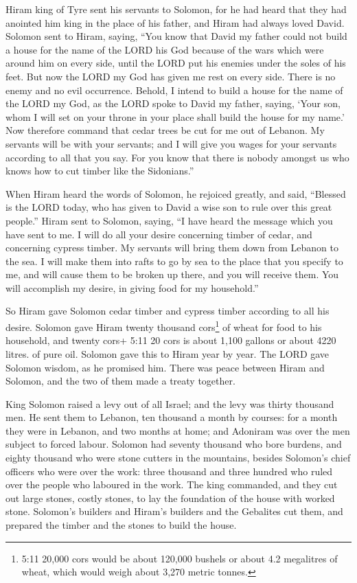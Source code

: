  Hiram king of Tyre sent his servants to Solomon, for he had
heard that they had anointed him king in the place of his father, and
Hiram had always loved David.  Solomon sent to Hiram,
saying,  ``You know that David my father could not build a
house for the name of the LORD his God because of the wars which were
around him on every side, until the LORD put his enemies under the soles
of his feet.  But now the LORD my God has given me rest on
every side. There is no enemy and no evil occurrence. 
Behold, I intend to build a house for the name of the LORD my God, as
the LORD spoke to David my father, saying, `Your son, whom I will set on
your throne in your place shall build the house for my name.'
 Now therefore command that cedar trees be cut for me out of
Lebanon. My servants will be with your servants; and I will give you
wages for your servants according to all that you say. For you know that
there is nobody amongst us who knows how to cut timber like the
Sidonians.''

 When Hiram heard the words of Solomon, he rejoiced greatly,
and said, ``Blessed is the LORD today, who has given to David a wise son
to rule over this great people.''  Hiram sent to Solomon,
saying, ``I have heard the message which you have sent to me. I will do
all your desire concerning timber of cedar, and concerning cypress
timber.  My servants will bring them down from Lebanon to
the sea. I will make them into rafts to go by sea to the place that you
specify to me, and will cause them to be broken up there, and you will
receive them. You will accomplish my desire, in giving food for my
household.''

 So Hiram gave Solomon cedar timber and cypress timber
according to all his desire.  Solomon gave Hiram twenty
thousand cors\footnote{5:11 20,000 cors would be about 120,000 bushels
  or about 4.2 megalitres of wheat, which would weigh about 3,270 metric
  tonnes.} of wheat for food to his household, and twenty cors+ 5:11 20
cors is about 1,100 gallons or about 4220 litres. of pure oil. Solomon
gave this to Hiram year by year.  The LORD gave Solomon
wisdom, as he promised him. There was peace between Hiram and Solomon,
and the two of them made a treaty together.

 King Solomon raised a levy out of all Israel; and the levy
was thirty thousand men.  He sent them to Lebanon, ten
thousand a month by courses: for a month they were in Lebanon, and two
months at home; and Adoniram was over the men subject to forced labour.
 Solomon had seventy thousand who bore burdens, and eighty
thousand who were stone cutters in the mountains,  besides
Solomon's chief officers who were over the work: three thousand and
three hundred who ruled over the people who laboured in the work.
 The king commanded, and they cut out large stones, costly
stones, to lay the foundation of the house with worked stone.
 Solomon's builders and Hiram's builders and the Gebalites
cut them, and prepared the timber and the stones to build the house.

